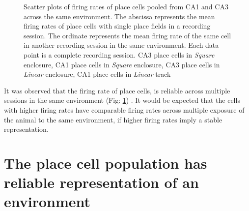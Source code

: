 \begin{figure}[htb!]
\centering
{}

\caption[Rate remapping]{Scatter plots of firing rates of place cells pooled from CA1 and CA3  across the same environment. The abscissa represents the mean firing rates of place cells with single place fields in a recording session. The ordinate represents the mean firing rate of the same cell in another recording session in the same environment. Each data point is a complete recording session.  CA3 place cells in \emph{Square} enclosure,  CA1 place cells in \emph{Square} enclosure,  CA3 place cells in \emph{Linear} enclosure,  CA1 place cells in \emph{Linear} track}
\label{fig:rateremapping}
\end{figure}





It was observed that the firing rate of place cells, is reliable across multiple sessions in the same environment (Fig:  \ref{fig:rateremapping}) . It would be expected that the cells with higher firing rates have comparable firing rates across multiple exposure of the animal to the same environment, if higher firing rates imply a stable representation. \\



\section[Population activity within a fixed environment]{The place cell population has reliable representation of an environment}


